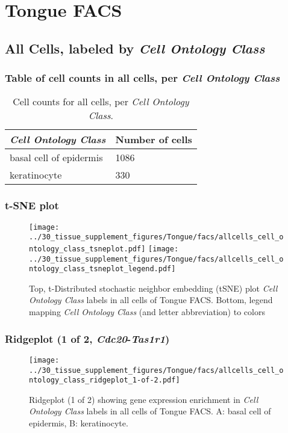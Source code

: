 \clearpage
\section{Tongue FACS}

\subsection{All Cells, labeled by \emph{Cell Ontology Class}}
\subsubsection{Table of cell counts in all cells, per \emph{Cell Ontology Class}}\begin{table}[h]
\centering
\label{my-label}
\begin{tabular}{@{}ll@{}}
\toprule

\emph{Cell Ontology Class}& Number of cells \\ \midrule
basal cell of epidermis & 1086 \\

keratinocyte & 330 \\
\bottomrule
\end{tabular}
\caption{Cell counts for all cells, per \emph{Cell Ontology Class}.}
\end{table}

\clearpage
\subsubsection{t-SNE plot}
\begin{figure}[h]
\centering
\texttt{[image: ../30\_tissue\_supplement\_figures/Tongue/facs/allcells\_cell\_ontology\_class\_tsneplot.pdf]}
\texttt{[image: ../30\_tissue\_supplement\_figures/Tongue/facs/allcells\_cell\_ontology\_class\_tsneplot\_legend.pdf]}
\caption{Top, t-Distributed stochastic neighbor embedding (tSNE) plot  \emph{Cell Ontology Class} labels in all cells of Tongue FACS. Bottom, legend mapping \emph{Cell Ontology Class} (and letter abbreviation) to colors}
\end{figure}


\clearpage

\subsubsection{Ridgeplot (1 of 2, \emph{Cdc20}-\emph{Tas1r1})}
\begin{figure}[h]
\centering
\texttt{[image: ../30\_tissue\_supplement\_figures/Tongue/facs/allcells\_cell\_ontology\_class\_ridgeplot\_1-of-2.pdf]}

\caption{ Ridgeplot (1 of 2)  showing gene expression enrichment in \emph{Cell Ontology Class} labels in all cells of Tongue FACS. A: basal cell of epidermis, B: keratinocyte.}
\end{figure}


